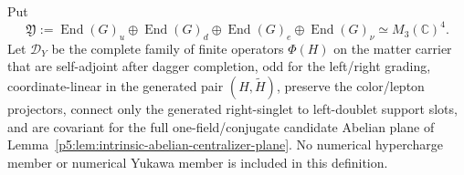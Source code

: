 \documentclass[12pt,a4paper]{article}
\begin{document}
\begin{definition}
\label{p5:def:v186-constrained-yukawa-dirac-family}
Put
\[
 \mathfrak Y
 :=\operatorname{End}(G)_u\oplus\operatorname{End}(G)_d
   \oplus\operatorname{End}(G)_e\oplus\operatorname{End}(G)_\nu
 \simeq M_3(\mathbb C)^4.
\]
Let $\mathscr D_Y$ be the complete family of finite operators $\Phi(H)$ on the
matter carrier that are self-adjoint after dagger completion, odd for the
left/right grading, coordinate-linear in the generated pair $(H,\widetilde
H)$, preserve the color/lepton projectors, connect only the generated
right-singlet to left-doublet support slots, and are covariant for the full
one-field/conjugate candidate Abelian plane of
Lemma~\ref{p5:lem:intrinsic-abelian-centralizer-plane}.  No numerical hypercharge member or
numerical Yukawa member is included in this definition.
\end{definition}
\end{document}
